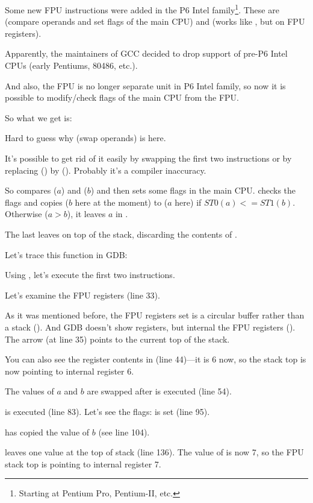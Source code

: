 ﻿
\label{gcc481_o3}

Some new FPU instructions were added in the P6 Intel family\footnote{Starting at Pentium Pro, Pentium-II, etc.}.
These are  (compare operands and set flags of the main CPU) and 
 (works like , but on FPU registers).

Apparently, the maintainers of GCC decided to drop support of pre-P6 Intel CPUs (early Pentiums, 80486, etc.).

And also, the FPU is no longer separate unit in P6 Intel family, so now it is possible to modify/check flags of the main CPU from the FPU.

So what we get is:



Hard to guess why  (swap operands) is here.

It's possible to get rid of it easily by swapping the first two \FLD instructions or by replacing 
 () by  ().
Probably it's a compiler inaccuracy.

So  compares  ($a$) and  ($b$) 
and then sets some flags in the main CPU.
 checks the flags and copies  
($b$ here at the moment) to 
 ($a$ here) if $ST0 (a) <= ST1 (b)$.
Otherwise ($a>b$), it leaves $a$ in .

The last \FSTP leaves  on top of the stack, discarding the contents of .

Let's trace this function in GDB:



Using , 
let's execute the first two \FLD instructions.

Let's examine the FPU registers (line 33).

As it was mentioned before, the FPU registers set is a circular buffer rather than a stack ().
And GDB doesn't show  registers, but internal the FPU registers (). 
The arrow (at line 35) points to the current top of the stack.

You can also see the  register contents in  (line 44)---it is 6 now, 
so the stack top is now pointing to internal register 6.

The values of $a$ and $b$ are swapped after  is executed (line 54).

 is executed (line 83). 
Let's see the flags: \CF is set (line 95).

 has copied the value of $b$ (see line 104).

\FSTP leaves one value at the top of stack (line 136). 
The value of  is now 7, so the FPU stack top is pointing to internal register 7.

